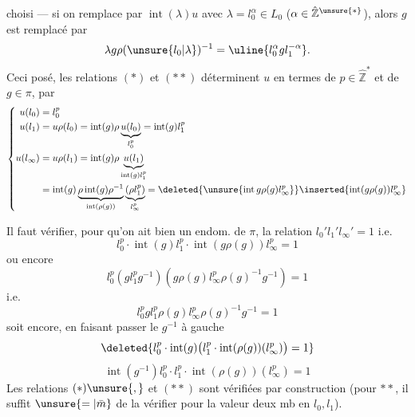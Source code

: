 choisi --- si on  remplace  par $\operatorname{int}(\lambda)u$ avec $\lambda=l_0^\alpha\in L_0$ ($\alpha\in\hat{\mathbb Z}^{\unsure{*}}$), alors $g$ est remplacé par
\[
\lambda g\rho(\unsure{l_0|\lambda})^{-1}=\uline{l_0^\alpha gl_1^{-\alpha}}.
\]
Ceci posé,  les relations $(*)$ et $(**)$ déterminent $u$ en termes de $p\in\hat{\mathbb Z}^{*}$ et de $g\in\pi$, par
\[
\left\{\begin{aligned}
u(l_0)&=l_0^p\\
u(l_1)&=u\rho(l_0)=\operatorname{int}(g)\rho\underbrace{u(l_0)}_{l_0^p}=\operatorname{int}(g)l_1^p\\
u(l_\infty)&=u\rho(l_1)=\operatorname{int}(g)\rho\underbrace{u(l_1)}_{\operatorname{int}(g)l_1^p}\\
&=\operatorname{int}(g)\underbrace{\rho\operatorname{int}(g)\rho^{-1}}_{\operatorname{int}(\rho(g))}\underbrace{(\rho l_1^p)}_{l_\infty^p}
=\deleted{\unsure{\operatorname{int}g\rho(g)l_\infty^p}}\inserted{\operatorname{int}(g\rho(g))l_\infty^p}
\end{aligned}\right.
\]

Il faut vérifier, pour qu'on ait bien un endom. de $\pi$, la relation $l_0'l_1'l_\infty'=1$ i.e.
\[
\boxed{l_0^p\cdot\operatorname{int}(g)l_1^p\cdot\operatorname{int}(g\rho(g))l_\infty^p=1}
\]
ou encore
\[
l_0^p(gl_1^pg^{-1})(g\rho(g)l_\infty^p\rho(g)^{-1}g^{-1})=1
\]
i.e.
\[
l_0^pgl_1^p\rho(g)l_\infty^p\rho(g)^{-1}g^{-1}=1
\]
soit encore, en faisant passer le $g^{-1}$ à gauche
\[
\deleted{l_0^p\cdot\operatorname{int}(g)\bigl(l_1^p\cdot\operatorname{int}(\rho(g))(l_\infty^p)\bigr)=1}
\]
\[
\operatorname{int}(g^{-1})l_0^p\cdot l_1^p\cdot\operatorname{int}(\rho(g))(l_\infty^p)=1
\]
Les relations $(*)\unsure{,}$ et $(**)$ sont vérifiées par construction (pour $**$, il suffit $\unsure{=|\bar m}$ de la vérifier pour la valeur  deux mb en $l_0,l_1$).
